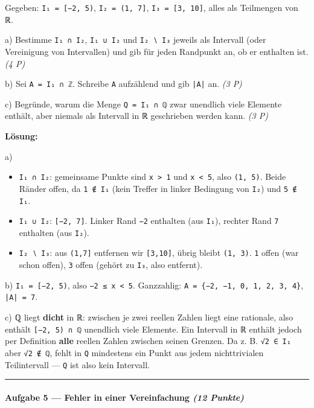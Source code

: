 \documentclass[11pt, a4paper]{article}
\begin{document}
Gegeben: \texttt{I₁ = [−2, 5)}, \texttt{I₂ = (1, 7]}, \texttt{I₃ = [3, 10]}, alles als Teilmengen von ℝ.


a) Bestimme \texttt{I₁ ∩ I₂}, \texttt{I₁ ∪ I₂} und \texttt{I₂ ∖ I₃} jeweils als Intervall (oder Vereinigung von Intervallen) und gib für jeden Randpunkt an, ob er enthalten ist. \textit{(4 P)}


b) Sei \texttt{A = I₁ ∩ ℤ}. Schreibe \texttt{A} aufzählend und gib \texttt{|A|} an. \textit{(3 P)}


c) Begründe, warum die Menge \texttt{Q = I₁ ∩ ℚ} zwar unendlich viele Elemente enthält, aber niemals als Intervall in ℝ geschrieben werden kann. \textit{(3 P)}


\textbf{Lösung:}


a)

\begin{itemize}
  \item \texttt{I₁ ∩ I₂}: gemeinsame Punkte sind \texttt{x > 1} und \texttt{x < 5}, also \texttt{(1, 5)}. Beide Ränder offen, da \texttt{1 ∉ I₁} (kein Treffer in linker Bedingung von \texttt{I₂}) und \texttt{5 ∉ I₁}.
  \item \texttt{I₁ ∪ I₂}: \texttt{[−2, 7]}. Linker Rand \texttt{−2} enthalten (aus \texttt{I₁}), rechter Rand \texttt{7} enthalten (aus \texttt{I₂}).
  \item \texttt{I₂ ∖ I₃}: aus \texttt{(1,7]} entfernen wir \texttt{[3,10]}, übrig bleibt \texttt{(1, 3)}. \texttt{1} offen (war schon offen), \texttt{3} offen (gehört zu \texttt{I₃}, also entfernt).
\end{itemize}

b) \texttt{I₁ = [−2, 5)}, also \texttt{−2 ≤ x < 5}. Ganzzahlig: \texttt{A = \{−2, −1, 0, 1, 2, 3, 4\}}, \texttt{|A| = 7}.


c) ℚ liegt \textbf{dicht} in ℝ: zwischen je zwei reellen Zahlen liegt eine rationale, also enthält \texttt{[−2, 5) ∩ ℚ} unendlich viele Elemente. Ein Intervall in ℝ enthält jedoch per Definition \textbf{alle} reellen Zahlen zwischen seinen Grenzen. Da z. B. \texttt{√2 ∈ I₁} aber \texttt{√2 ∉ ℚ}, fehlt in \texttt{Q} mindestens ein Punkt aus jedem nichttrivialen Teilintervall — \texttt{Q} ist also kein Intervall.



\noindent\textcolor{rulegray}{\rule{\linewidth}{0.4pt}}


\paragraph{Aufgabe 5 — Fehler in einer Vereinfachung \textit{(12 Punkte)}}\mbox{}\\[2pt]
\end{document}
